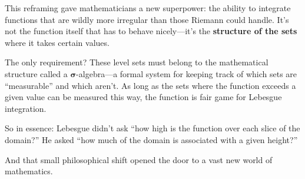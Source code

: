This reframing gave mathematicians a new superpower: the ability to integrate functions that are wildly more irregular than those Riemann could handle. It’s not the function itself that has to behave nicely—it’s the \textbf{structure of the sets} where it takes certain values.

The only requirement? These level sets must belong to the mathematical structure called a \( \boldsymbol{\sigma} \)-algebra—a formal system for keeping track of which sets are “measurable” and which aren’t. As long as the sets where the function exceeds a given value can be measured this way, the function is fair game for Lebesgue integration.

So in essence:  
Lebesgue didn’t ask \textquotedblleft how high is the function over each slice of the domain?\textquotedblright  
He asked \textquotedblleft how much of the domain is associated with a given height?\textquotedblright  

And that small philosophical shift opened the door to a vast new world of mathematics.

